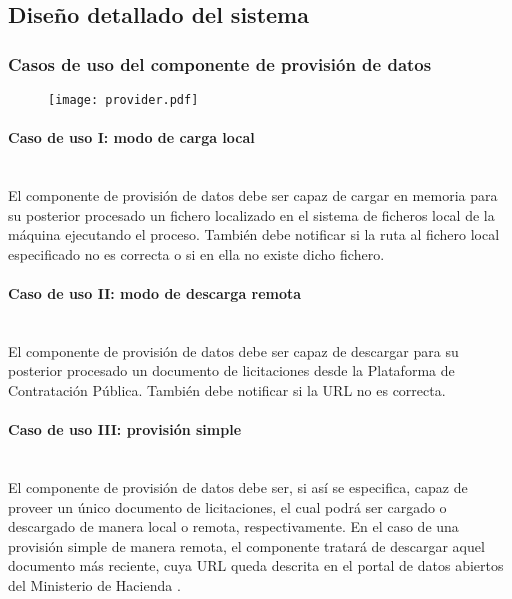     
    \subsection{Diseño detallado del sistema} \label{subsec:detallado}
        \subsubsection{Casos de uso del componente de provisión de datos}
    
            \begin{figure}[h]
                \centering
                \texttt{[image: provider.pdf]}
                \label{fig:provider}
            \end{figure}
            
            \paragraph{Caso de uso I: modo de carga local} \mbox{}\\
                El componente de provisión de datos debe ser capaz de cargar en memoria para su posterior procesado un fichero localizado en el sistema de ficheros local de la máquina ejecutando el proceso. También debe notificar si la ruta al fichero local especificado no es correcta o si en ella no existe dicho fichero.
                
            \paragraph{Caso de uso II: modo de descarga remota} \mbox{}\\
                El componente de provisión de datos debe ser capaz de descargar para su posterior procesado un documento de licitaciones desde la Plataforma de Contratación Pública. También debe notificar si la URL no es correcta.
            
            \paragraph{Caso de uso III: provisión simple} \mbox{}\\
                El componente de provisión de datos debe ser, si así se especifica, capaz de proveer un único documento de licitaciones, el cual podrá ser cargado o descargado de manera local o remota, respectivamente. En el caso de una provisión simple de manera remota, el componente tratará de descargar aquel documento más reciente, cuya URL \cite{LICIDIA} queda descrita en el portal de datos abiertos del Ministerio de Hacienda \cite{PORTALHAC}.
                
